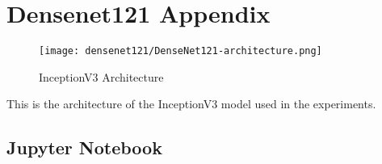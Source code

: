 \section{Densenet121 Appendix}\label{s:densenet121_appendix}

\begin{figure}[H]
  \begin{center}
    \texttt{[image: densenet121/DenseNet121-architecture.png]}
  \end{center}
  \caption{InceptionV3 Architecture}\label{f:inceptionv3_arch}
\end{figure}

This is the architecture of the InceptionV3 model used in the experiments.

\subsection{Jupyter Notebook}

